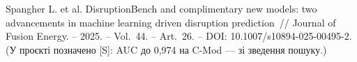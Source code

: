  Spangher L. et al. DisruptionBench and complimentary new models: two advancements in machine learning driven disruption prediction~//
  Journal of Fusion Energy. -- 2025. -- Vol.~44. -- Art.~26. -- DOI: 10.1007/s10894-025-00495-2.
  (У проєкті позначено [S]: AUC до 0,974 на C-Mod --- зі зведення пошуку.)
